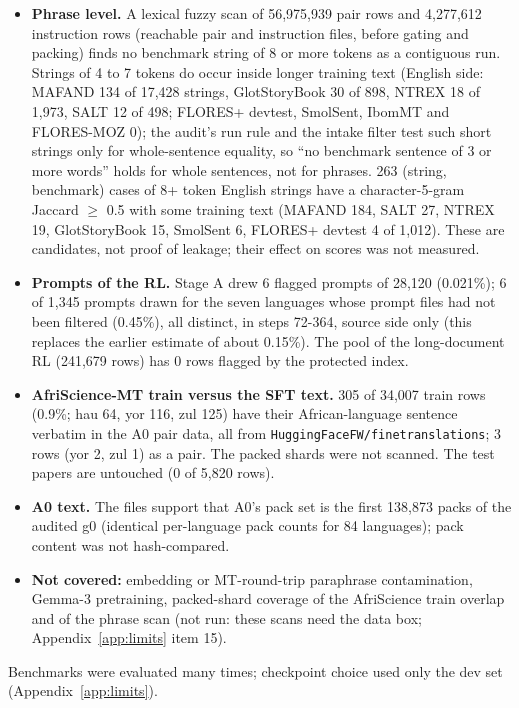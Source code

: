 \begin{itemize}
\item \textbf{Phrase level.} A lexical fuzzy scan of 56,975,939 pair rows and 4,277,612 instruction rows (reachable pair and instruction files, before gating and packing) finds no benchmark string of 8 or more tokens as a contiguous run. Strings of 4 to 7 tokens do occur inside longer training text (English side: MAFAND 134 of 17,428 strings, GlotStoryBook 30 of 898, NTREX 18 of 1,973, SALT 12 of 498; FLORES+ devtest, SmolSent, IbomMT and FLORES-MOZ 0); the audit's run rule and the intake filter test such short strings only for whole-sentence equality, so ``no benchmark sentence of 3 or more words'' holds for whole sentences, not for phrases. 263 (string, benchmark) cases of 8+ token English strings have a character-5-gram Jaccard $\ge$ 0.5 with some training text (MAFAND 184, SALT 27, NTREX 19, GlotStoryBook 15, SmolSent 6, FLORES+ devtest 4 of 1,012). These are candidates, not proof of leakage; their effect on scores was not measured.
\item \textbf{Prompts of the RL.} Stage A drew 6 flagged prompts of 28,120 (0.021\%); 6 of 1,345 prompts drawn for the seven languages whose prompt files had not been filtered (0.45\%), all distinct, in steps 72-364, source side only (this replaces the earlier estimate of about 0.15\%). The pool of the long-document RL (241,679 rows) has 0 rows flagged by the protected index.
\item \textbf{AfriScience-MT train versus the SFT text.} 305 of 34,007 train rows (0.9\%; hau 64, yor 116, zul 125) have their African-language sentence verbatim in the A0 pair data, all from \texttt{HuggingFaceFW/\allowbreak{}finetranslations}; 3 rows (yor 2, zul 1) as a pair. The packed shards were not scanned. The test papers are untouched (0 of 5,820 rows).
\item \textbf{A0 text.} The files support that A0's pack set is the first 138,873 packs of the audited g0 (identical per-language pack counts for 84 languages); pack content was not hash-compared.
\item \textbf{Not covered:} embedding or MT-round-trip paraphrase contamination, Gemma-3 pretraining, packed-shard coverage of the AfriScience train overlap and of the phrase scan (not run: these scans need the data box; Appendix~\ref{app:limits} item 15).
\end{itemize}

Benchmarks were evaluated many times; checkpoint choice used only the dev set (Appendix~\ref{app:limits}).

